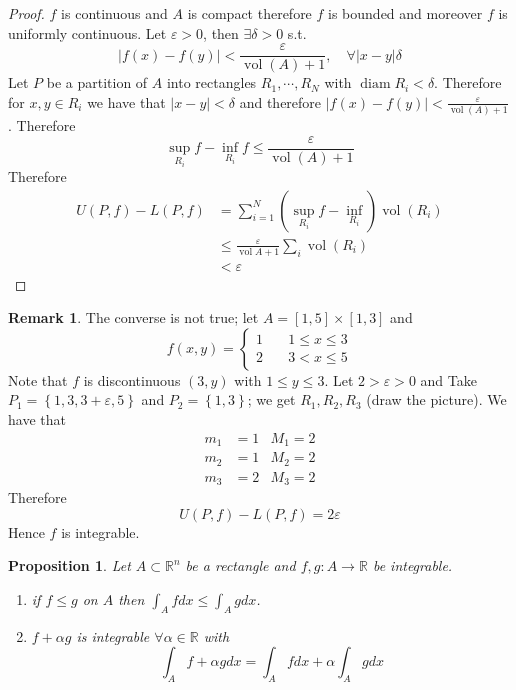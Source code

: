 \documentclass[11pt,a4paper]{article}
\theoremstyle{definition}
\newtheorem{remark}[definition]{Remark}
\theoremstyle{plain}
\newtheorem{proposition}[definition]{Proposition}
\theoremstyle{remark}
\newcommand{\R}{\mathbb{R}}
\renewcommand{\set}[1]{\left\{ #1 \right\}}
\newcommand{\vol}{\operatorname{vol}}
\begin{document}
\begin{proof}
    $f$ is continuous and $A$ is compact therefore $f$ is bounded and moreover $f$ is uniformly continuous. 
    Let $\varepsilon > 0$, then $\exists \delta > 0$ s.t. 
    $$|f(x) - f(y)| < \frac{\varepsilon}{\vol (A) + 1}, \quad \forall |x-y| \delta$$
    Let $P$ be a partition of $A$ into rectangles $R_1, \cdots, R_N$ with $\operatorname{diam} R_i < \delta$. 
    Therefore for $x, y \in R_i$ we have that $|x-y| < \delta$ and therefore 
    $|f(x) - f(y)| < \frac{\varepsilon}{\vol (A) + 1}$. Therefore 
    $$\sup_{R_i} f - \inf_{R_i} f \le \frac{\varepsilon}{\vol (A) + 1}$$
    Therefore 
    \begin{align*}
        U(P,f) - L(P,f) &= \sum_{i=1}^N (\sup_{R_i} f - \inf_{R_i}) \vol (R_i) \\
        &\le \frac{\varepsilon}{\vol A + 1} \sum_i \vol (R_i) \\
        &< \varepsilon
    \end{align*}
\end{proof}

\begin{remark}
    The converse is not true; let $A = [1, 5] \times [1,3]$ and 
    $$f(x,y) = \begin{cases}
        1 \quad& 1 \le x \le 3 \\
        2 \quad& 3 < x \le 5
    \end{cases}$$
    Note that $f$ is discontinuous $(3,y)$ with $1 \le y \le 3$. Let $2 > \varepsilon > 0$ and 
    Take $P_1 = \set{1,3, 3 + \varepsilon, 5}$ and $P_2 = \set{1,3}$; we get $R_1, R_2, R_3$ (draw the picture).
    We have that 
    \begin{align*}
        m_1 &= 1 &M_1 = 2 \\
        m_2 &= 1 &M_2 = 2 \\
        m_3 &= 2 &M_3 = 2
    \end{align*}
    Therefore 
    $$U(P,f) - L(P,f) = 2 \varepsilon$$
    Hence $f$ is integrable.  
\end{remark}

\begin{proposition}
    Let $A \subset \R^n$ be a rectangle and $f, g \colon A \to \R$ be integrable. 
    \begin{enumerate}
        \item if $f \le g$ on $A$ then $\int_A f dx \le \int_A g dx$. 
        \item $f + \alpha g$ is integrable $\forall \alpha \in \R$ with 
        $$\int_A f + \alpha g dx = \int_A f dx + \alpha \int_A g dx$$
    \end{enumerate}
\end{proposition}
\end{document}
